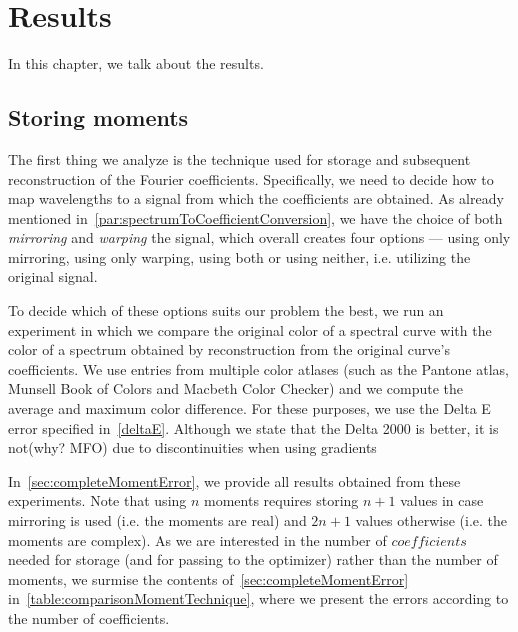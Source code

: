 \chapter{Results}

In this chapter, we talk about the results. 

\section{Storing moments} \label{sec:storingMoments}

The first thing we analyze is the technique used for storage and subsequent reconstruction of the Fourier coefficients. Specifically, we need to decide how to map wavelengths to a signal from which the coefficients are obtained. As already mentioned in~\cref{par:spectrumToCoefficientConversion}, we have the choice of both \emph{mirroring} and \emph{warping} the signal, which overall creates four options --- using only mirroring, using only warping, using both or using neither, i.e. utilizing the original signal.

To decide which of these options suits our problem the best, we run an experiment in which we compare the original color of a spectral curve with the color of a spectrum obtained by reconstruction from the original curve's coefficients. We use entries from multiple color atlases (such as the Pantone atlas, Munsell Book of Colors and Macbeth Color Checker) and we compute the average and maximum color difference. For these purposes, we use the Delta E error specified in~\cref{deltaE}. Although we state that the Delta 2000 is better, it is not(why? MFO) due to  discontinuities when using gradients

In~\cref{sec:completeMomentError}, we provide all results obtained from these experiments. Note that using $n$ moments requires storing $n+1$ values in case mirroring is used (i.e. the moments are real) and $2n+1$ values otherwise (i.e. the moments are complex). As we are interested in the number of $coefficients$ needed for storage (and for passing to the optimizer) rather than the number of moments, we surmise the contents of~\cref{sec:completeMomentError} in~\cref{table:comparisonMomentTechnique}, where we present the errors according to the number of coefficients.

